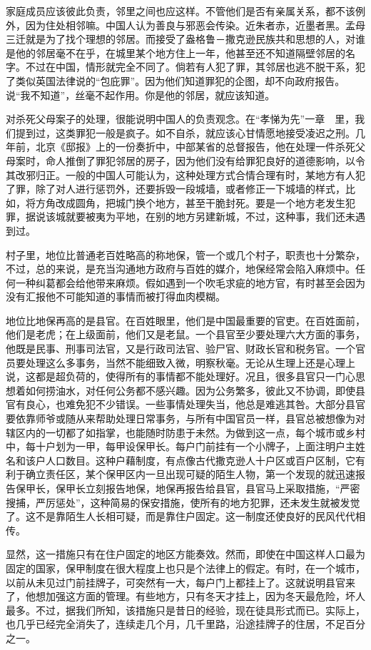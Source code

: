 \documentclass[12pt,oneside]{book}
\begin{document}
\begin{common-format}
家庭成员应该彼此负责，邻里之间也应这样。不管他们是否有亲属关系，都不该例外，因为住处相邻嘛。中国人认为善良与邪恶会传染。近朱者赤，近墨者黑。孟母三迁就是为了找个理想的邻居。而接受了盎格鲁－撒克逊民族共和思想的人，对谁是他的邻居毫不在乎，在城里某个地方住上一年，他甚至还不知道隔壁邻居的名字。不过在中国，情形就完全不同了。倘若有人犯了罪，其邻居也逃不脱干系，犯了类似英国法律说的“包庇罪”。因为他们知道罪犯的企图，却不向政府报告。说“我不知道”，丝毫不起作用。你是他的邻居，就应该知道。 

对杀死父母案子的处理，很能说明中国人的负责观念。在“孝悌为先”一章　里，我们提到过，这类罪犯一般是疯子。如不自杀，就应该心甘情愿地接受凌迟之刑。几年前，北京《邸报》上的一份奏折中，中部某省的总督报告，他在处理一件杀死父母案时，命人推倒了罪犯邻居的房子，因为他们没有给罪犯良好的道德影响，以令其改邪归正。一般的中国人可能认为，这种处理方式合情合理有时，某地方有人犯了罪，除了对人进行惩罚外，还要拆毁一段城墙，或者修正一下城墙的样式，比如，将方角改成圆角，把城门换个地方，甚至干脆封死。要是一个地方老发生犯罪，据说该城就要被夷为平地，在别的地方另建新城，不过，这种事，我们还未遇到过。 

村子里，地位比普通老百姓略高的称地保，管一个或几个村子，职责也十分繁杂，不过，总的来说，是充当沟通地方政府与百姓的媒介，地保经常会陷入麻烦中。任何一种纠葛都会给他带来麻烦。假如遇到一个吹毛求疵的地方官，有时甚至会因为没有汇报他不可能知道的事情而被打得血肉模糊。 

地位比地保再高的是县官。在百姓眼里，他们是中国最重要的官吏。在百姓面前，他们是老虎；在上级面前，他们又是老鼠。一个县官至少要处理六大方面的事务，他既是民事、刑事司法官，又是行政司法官、验尸官、财政长官和税务官。一个官员要处理这么多事务，当然不能细致入微，明察秋毫。无论从生理上还是心理上说，这都是超负荷的，使得所有的事情都不能处理好。况且，很多县官只一门心思想着如何捞油水，对任何公务都不感兴趣。因为公务繁多，彼此又不协调，即使县官有良心，也难免犯不少错误。一些事情处理失当，他总是难逃其咎。大部分县官要依靠师爷或随从来帮助处理日常事务，与所有中国官员一样，县官总被想像为对辖区内的一切都了如指掌，也能随时防患于未然。为做到这一点，每个城市或乡村中，每十户划为一甲，每甲设保甲长。每户门前挂有一个小牌子，上面注明户主姓名和该户人口数目。这种户藉制度，有点像古代撒克逊人十户区或百户区制，它有利于确立责任区，某个保甲区内一旦出现可疑的陌生人物，第一个发现的就迅速报告保甲长，保甲长立刻报告地保，地保再报告给县官，县官马上采取措施，“严密搜捕，严厉惩处”，这种简易的保安措施，使所有的地方犯罪，还未发生就被发觉了。这不是靠陌生人长相可疑，而是靠住户固定。这一制度还使良好的民风代代相传。 

显然，这一措施只有在住户固定的地区方能奏效。然而，即使在中国这样人口最为固定的国家，保甲制度在很大程度上也只是个法律上的假定。有时，在一个城市，以前从未见过门前挂牌子，可突然有一大，每户门上都挂上了。这就说明县官来了，他想加强这方面的管理。有些地方，只有冬天才挂上，因为冬天最危险，坏人最多。不过，据我们所知，该措施只是昔日的经验，现在徒具形式而已。实际上，也几乎已经完全消失了，连续走几个月，几千里路，沿途挂牌子的住居，不足百分之一。 


\end{common-format}
\end{document}
